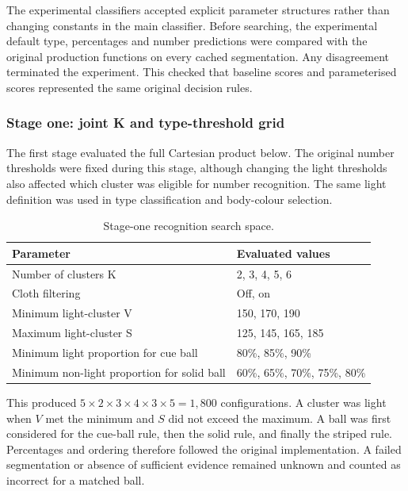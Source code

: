 The experimental classifiers accepted explicit parameter structures rather
than changing constants in the main classifier. Before searching, the
experimental default type, percentages and number predictions were compared
with the original production functions on every cached segmentation. Any
disagreement terminated the experiment. This checked that baseline scores
and parameterised scores represented the same original decision rules.

\subsubsection{Stage one: joint K and type-threshold grid}

The first stage evaluated the full Cartesian product below. The original
number thresholds were fixed during this stage, although changing the light
thresholds also affected which cluster was eligible for number recognition.
The same light definition was used in type classification and body-colour
selection.

\begin{table}[htbp]
\centering
\small
\caption{Stage-one recognition search space.}
\label{tab:recognition-search-space}
\begin{tabular}{ll}
\toprule
Parameter & Evaluated values \\
\midrule
Number of clusters K & 2, 3, 4, 5, 6 \\
Cloth filtering & Off, on \\
Minimum light-cluster V & 150, 170, 190 \\
Maximum light-cluster S & 125, 145, 165, 185 \\
Minimum light proportion for cue ball & 80\%, 85\%, 90\% \\
Minimum non-light proportion for solid ball & 60\%, 65\%, 70\%, 75\%, 80\% \\
\bottomrule
\end{tabular}
\end{table}
\FloatBarrier

This produced $5\times2\times3\times4\times3\times5=1{,}800$
configurations. A cluster was light when $V$ met the minimum and $S$ did
not exceed the maximum. A ball was first considered for the cue-ball rule,
then the solid rule, and finally the striped rule. Percentages and ordering
therefore followed the original implementation. A failed segmentation or
absence of sufficient evidence remained unknown and counted as incorrect
for a matched ball.

